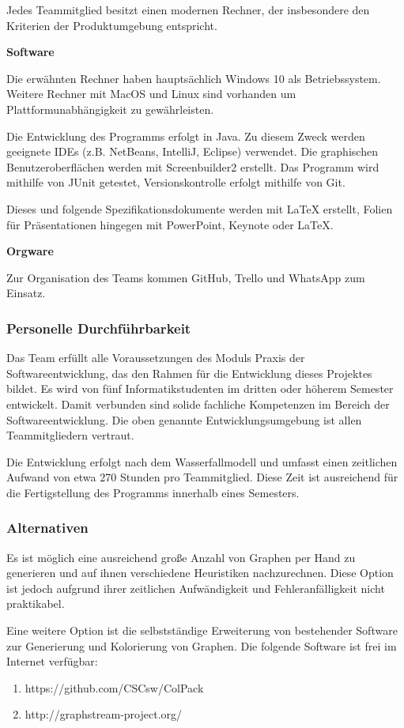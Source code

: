 \documentclass{article}
\begin{document}
	Jedes Teammitglied besitzt einen modernen Rechner, der insbesondere den Kriterien der Produktumgebung entspricht.
	\newline
	
	\textbf{Software}
	
	Die erwähnten Rechner haben hauptsächlich Windows 10 als Betriebssystem. Weitere Rechner mit MacOS und Linux sind vorhanden um Plattformunabhängigkeit zu gewährleisten.
	
	Die Entwicklung des Programms erfolgt in Java. Zu diesem Zweck werden geeignete IDEs (z.B. NetBeans, IntelliJ, Eclipse) verwendet. Die graphischen Benutzeroberflächen werden mit Screenbuilder2 erstellt. Das Programm wird mithilfe von JUnit getestet, Versionskontrolle erfolgt mithilfe von Git.
	
	Dieses und folgende Spezifikationsdokumente werden mit LaTeX erstellt, Folien für Präsentationen hingegen mit PowerPoint, Keynote oder LaTeX.
	\newline
	
	\textbf{Orgware}
	
	Zur Organisation des Teams kommen GitHub, Trello und WhatsApp zum Einsatz.
	
	\subsubsection{Personelle Durchführbarkeit}
	Das Team erfüllt alle Voraussetzungen des Moduls Praxis der Softwareentwicklung, das den Rahmen für die Entwicklung dieses Projektes bildet. Es wird von fünf Informatikstudenten im dritten oder höherem Semester entwickelt. Damit verbunden sind solide fachliche Kompetenzen im Bereich der Softwareentwicklung. Die oben genannte Entwicklungsumgebung ist allen Teammitgliedern vertraut.
	
	Die Entwicklung erfolgt nach dem Wasserfallmodell und umfasst einen zeitlichen Aufwand von etwa 270 Stunden pro Teammitglied. Diese Zeit ist ausreichend für die Fertigstellung des Programms innerhalb eines Semesters.
	
	
	\subsubsection{Alternativen}
	Es ist möglich eine ausreichend große Anzahl von Graphen per Hand zu generieren und auf ihnen verschiedene Heuristiken nachzurechnen. Diese Option ist jedoch aufgrund ihrer zeitlichen Aufwändigkeit und Fehleranfälligkeit nicht praktikabel.
	
	Eine weitere Option ist die selbstständige Erweiterung von bestehender Software zur Generierung und Kolorierung von Graphen. Die folgende Software ist frei im Internet verfügbar:
	\begin{enumerate}[--]
		\item{https://github.com/CSCsw/ColPack}
		\item{http://graphstream-project.org/}
	\end{enumerate}
	
\end{document}
